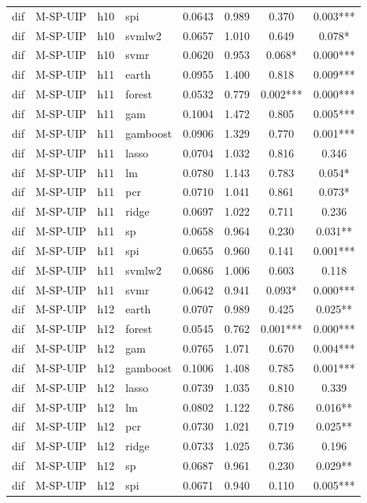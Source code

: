 \begin{ThreePartTable}
\begin{longtable}[t]{llclcccc}
dif & M-SP-UIP & h10 & spi & 0.0643 & 0.989 & 0.370 & 0.003***\\
dif & M-SP-UIP & h10 & svmlw2 & 0.0657 & 1.010 & 0.649 & 0.078*\\
dif & M-SP-UIP & h10 & svmr & 0.0620 & 0.953 & 0.068* & 0.000***\\
\addlinespace
dif & M-SP-UIP & h11 & earth & 0.0955 & 1.400 & 0.818 & 0.009***\\
dif & M-SP-UIP & h11 & forest & 0.0532 & 0.779 & 0.002*** & 0.000***\\
dif & M-SP-UIP & h11 & gam & 0.1004 & 1.472 & 0.805 & 0.005***\\
dif & M-SP-UIP & h11 & gamboost & 0.0906 & 1.329 & 0.770 & 0.001***\\
dif & M-SP-UIP & h11 & lasso & 0.0704 & 1.032 & 0.816 & 0.346\\
dif & M-SP-UIP & h11 & lm & 0.0780 & 1.143 & 0.783 & 0.054*\\
dif & M-SP-UIP & h11 & pcr & 0.0710 & 1.041 & 0.861 & 0.073*\\
dif & M-SP-UIP & h11 & ridge & 0.0697 & 1.022 & 0.711 & 0.236\\
dif & M-SP-UIP & h11 & sp & 0.0658 & 0.964 & 0.230 & 0.031**\\
dif & M-SP-UIP & h11 & spi & 0.0655 & 0.960 & 0.141 & 0.001***\\
dif & M-SP-UIP & h11 & svmlw2 & 0.0686 & 1.006 & 0.603 & 0.118\\
dif & M-SP-UIP & h11 & svmr & 0.0642 & 0.941 & 0.093* & 0.000***\\
\addlinespace
dif & M-SP-UIP & h12 & earth & 0.0707 & 0.989 & 0.425 & 0.025**\\
dif & M-SP-UIP & h12 & forest & 0.0545 & 0.762 & 0.001*** & 0.000***\\
dif & M-SP-UIP & h12 & gam & 0.0765 & 1.071 & 0.670 & 0.004***\\
dif & M-SP-UIP & h12 & gamboost & 0.1006 & 1.408 & 0.785 & 0.001***\\
dif & M-SP-UIP & h12 & lasso & 0.0739 & 1.035 & 0.810 & 0.339\\
dif & M-SP-UIP & h12 & lm & 0.0802 & 1.122 & 0.786 & 0.016**\\
dif & M-SP-UIP & h12 & pcr & 0.0730 & 1.021 & 0.719 & 0.025**\\
dif & M-SP-UIP & h12 & ridge & 0.0733 & 1.025 & 0.736 & 0.196\\
dif & M-SP-UIP & h12 & sp & 0.0687 & 0.961 & 0.230 & 0.029**\\
dif & M-SP-UIP & h12 & spi & 0.0671 & 0.940 & 0.110 & 0.005***\\

\end{longtable}
\end{ThreePartTable}
